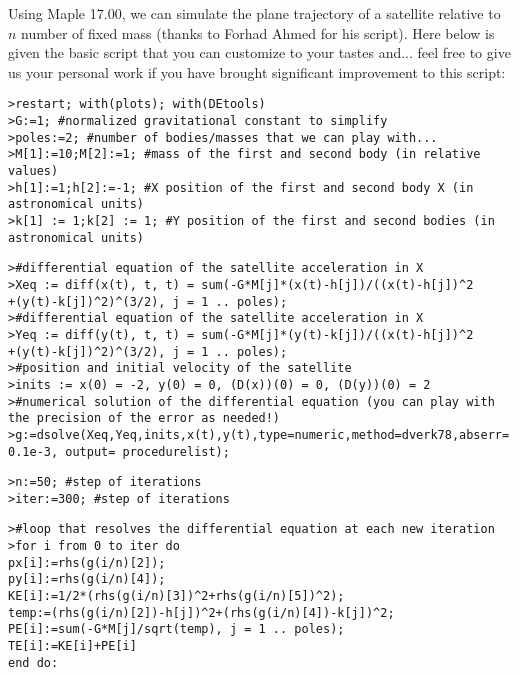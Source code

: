 	Using Maple 17.00, we can simulate the plane trajectory of a satellite relative to $n$ number of fixed mass (thanks to Forhad Ahmed for his script). Here below is given the basic script that you can customize to your tastes and... feel free to give us your personal work if you have brought significant improvement to this script:
	
	\texttt{>restart; with(plots); with(DEtools)\\
	>G:=1; \#normalized gravitational constant to simplify\\
	>poles:=2; \#number of bodies/masses that we can play with...\\
	>M[1]:=10;M[2]:=1; \#mass of the first and second body (in relative values)\\
	>h[1]:=1;h[2]:=-1; \#X position of the first and second body X (in astronomical units)\\
	>k[1] := 1;k[2] := 1; \#Y position of the first and second bodies (in astronomical units)}
	
	\texttt{>\#differential equation of the satellite acceleration in X\\
	>Xeq := diff(x(t), t, t) = sum(-G*M[j]*(x(t)-h[j])/((x(t)-h[j])\string^2\\+(y(t)-k[j])\string^2)\string^(3/2), j = 1 .. poles);\\
	>\#differential equation of the satellite acceleration in X\\
	>Yeq := diff(y(t), t, t) = sum(-G*M[j]*(y(t)-k[j])/((x(t)-h[j])\string^2\\+(y(t)-k[j])\string^2)\string^(3/2), j = 1 .. poles);\\
	>\#position and initial velocity of the satellite\\
	>inits := x(0) = -2, y(0) = 0, (D(x))(0) = 0, (D(y))(0) = 2\\
	>\#numerical solution of the differential equation (you can play with the precision of the error as needed!)\\
	>g:=dsolve({Xeq,Yeq,inits},{x(t),y(t)},type=numeric,method=dverk78,abserr=0.1e-3, output= procedurelist);}
	
	\texttt{>n:=50; \#step of iterations\\
	>iter:=300; \#step of iterations}
	
	\texttt{>\#loop that resolves the differential equation at each new iteration\\
	>for i from 0 to iter do \\
	px[i]:=rhs(g(i/n)[2]);\\
	py[i]:=rhs(g(i/n)[4]);\\
	KE[i]:=1/2*(rhs(g(i/n)[3])\string^2+rhs(g(i/n)[5])\string^2);\\
	temp:=(rhs(g(i/n)[2])-h[j])\string^2+(rhs(g(i/n)[4])-k[j])\string^2;\\
	PE[i]:=sum(-G*M[j]/sqrt(temp), j = 1 .. poles);\\
	TE[i]:=KE[i]+PE[i]\\
	end do:}
	

